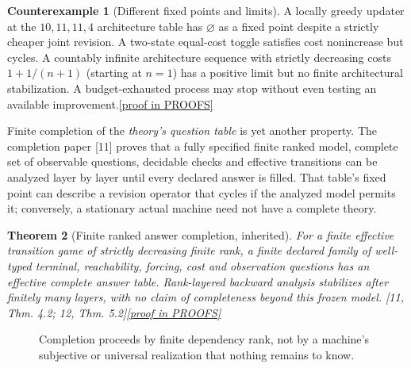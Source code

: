 \documentclass[11pt,letterpaper]{article}
\newtheorem{theorem}{Theorem}[section]
\theoremstyle{definition}
\newtheorem{counterexample}[theorem]{Counterexample}
\theoremstyle{remark}
\newcommand{\prooflink}[1]{\hfill\hyperlink{proof:#1}{\footnotesize[proof in PROOFS]}}
\newcommand{\src}[1]{\textup{[#1]}}
\begin{document}
\begin{counterexample}[Different fixed points and limits]\label{cex:fixed}\hypertarget{claim:fixed}{}
A locally greedy updater at the $10,11,11,4$ architecture table has $\varnothing$ as a fixed point despite a strictly cheaper joint revision. A two-state equal-cost toggle satisfies cost nonincrease but cycles. A countably infinite architecture sequence with strictly decreasing costs $1+1/(n+1)$ (starting at $n=1$) has a positive limit but no finite architectural stabilization. A budget-exhausted process may stop without even testing an available improvement.\prooflink{fixed}
\end{counterexample}

Finite completion of the \emph{theory's question table} is yet another property. The completion paper \src{11} proves that a fully specified finite ranked model, complete set of observable questions, decidable checks and effective transitions can be analyzed layer by layer until every declared answer is filled. That table's fixed point can describe a revision operator that cycles if the analyzed model permits it; conversely, a stationary actual machine need not have a complete theory.

\begin{theorem}[Finite ranked answer completion, inherited]\label{thm:completion}\hypertarget{claim:completion}{}
For a finite effective transition game of strictly decreasing finite rank, a finite declared family of well-typed terminal, reachability, forcing, cost and observation questions has an effective complete answer table. Rank-layered backward analysis stabilizes after finitely many layers, with no claim of completeness beyond this frozen model. \src{11, Thm. 4.2; 12, Thm. 5.2}\prooflink{completion}
\end{theorem}

\begin{figure}[htbp]\centering
{}
\caption{Completion proceeds by finite dependency rank, not by a machine's subjective or universal realization that nothing remains to know.}\end{figure}
\end{document}
